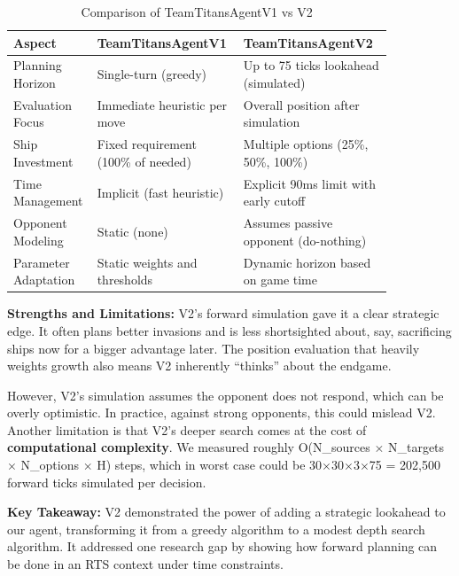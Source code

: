 \documentclass[conference]{IEEEtran}
\begin{document}
\begin{table}[htbp]
\caption{Comparison of TeamTitansAgentV1 vs V2}
\begin{center}
\begin{tabular}{|p{0.14\linewidth}|p{0.33\linewidth}|p{0.38\linewidth}|}
\hline
\textbf{Aspect} & \textbf{TeamTitansAgentV1} & \textbf{TeamTitansAgentV2} \\
\hline
Planning Horizon & Single-turn (greedy) & Up to 75 ticks lookahead (simulated) \\
\hline
Evaluation Focus & Immediate heuristic per move & Overall position after simulation \\
\hline
Ship Investment & Fixed requirement (100\% of needed) & Multiple options (25\%, 50\%, 100\%) \\
\hline
Time Management & Implicit (fast heuristic) & Explicit 90ms limit with early cutoff \\
\hline
Opponent Modeling & Static (none) & Assumes passive opponent (do-nothing) \\
\hline
Parameter Adaptation & Static weights and thresholds & Dynamic horizon based on game time \\
\hline
\end{tabular}
\end{center}
\end{table}

\textbf{Strengths and Limitations:} V2's forward simulation gave it a clear strategic edge. It often plans better invasions and is less shortsighted about, say, sacrificing ships now for a bigger advantage later. The position evaluation that heavily weights growth also means V2 inherently ``thinks'' about the endgame.

However, V2's simulation assumes the opponent does not respond, which can be overly optimistic. In practice, against strong opponents, this could mislead V2. Another limitation is that V2's deeper search comes at the cost of \textbf{computational complexity}. We measured roughly O(N\_sources $\times$ N\_targets $\times$ N\_options $\times$ H) steps, which in worst case could be 30$\times$30$\times$3$\times$75 = 202,500 forward ticks simulated per decision.

\textbf{Key Takeaway:} V2 demonstrated the power of adding a strategic lookahead to our agent, transforming it from a greedy algorithm to a modest depth search algorithm. It addressed one research gap by showing how forward planning can be done in an RTS context under time constraints.
\end{document}
